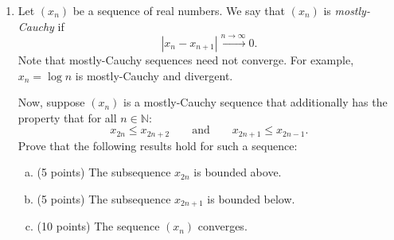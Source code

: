\documentclass{amsart}
\begin{document}
\begin{enumerate}[1.]
\newpage
\item Let $(x_n)$ be a sequence of real numbers. We say that $(x_n)$ is \emph{mostly-Cauchy} if
\[ |x_n - x_{n+1}| \xrightarrow{n \to \infty} 0.\]
Note that mostly-Cauchy sequences need not converge. For example, $x_n=\log n$ is mostly-Cauchy and divergent.

Now, suppose $(x_n)$ is a mostly-Cauchy sequence that additionally has the property that for all $n \in \mathbb{N}$:
\[ x_{2n} \leq x_{2n+2} \qquad \text{and} \qquad x_{2n+1} \leq x_{2n-1}.\]
Prove that the following results hold for such a sequence:
\begin{enumerate}[(a)]
	\item (5 points) The subsequence $x_{2n}$ is bounded above.
	\item (5 points) The subsequence $x_{2n+1}$ is bounded below.
	\item (10 points) The sequence $(x_n)$ converges.
\end{enumerate}
\end{enumerate}
\end{document}
